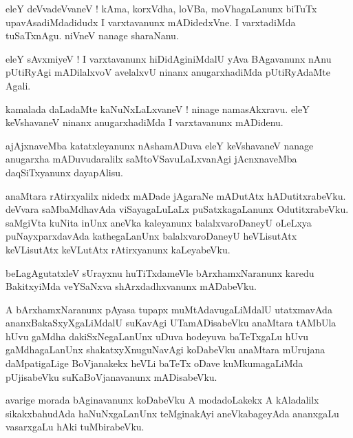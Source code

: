 \documentclass{article}
\begin{document}
\begin{mn}%
eleY deVvadeVvaneV ! kAma, korxVdha, loVBa, moVhagaLanunx biTuTx upavAsadiMdadidudx I varxtavanunx mADidedxVne. I 
varxtadiMda tuSaTxnAgu. niVneV nanage sharaNanu.
\end{mn}

\begin{mn}%
eleY sAvxmiyeV ! I varxtavanunx hiDidAginiMdalU yAva BAgavanunx nAnu pUtiRyAgi mADilalxvoV avelalxvU  ninanx 
anugarxhadiMda pUtiRyAdaMte Agali.
\end{mn}

\begin{mn}%
kamalada daLadaMte kaNuNxLaLxvaneV ! ninage namasAkxravu. eleY keVshavaneV ninanx anugarxhadiMda I varxtavanunx mADidenu.
\end{mn}

\begin{mn}%
ajAjxnaveMba katatxleyanunx nAshamADuva eleY keVshavaneV nanage anugarxha mADuvudaralilx saMtoVSavuLaLxvanAgi 
jAcnxnaveMba daqSiTxyanunx dayapAlisu.
\end{mn}

\begin{mn}%
anaMtara rAtirxyalilx nidedx mADade jAgaraNe mADutAtx hADutitxrabeVku. deVvara saMbaMdhavAda viSayagaLuLaLx 
puSatxkagaLanunx OdutitxrabeVku. saMgiVta kuNita inUnx aneVka kaleyanunx balalxvaroDaneyU oLeLxya puNayxparxdavAda 
kathegaLanUnx balalxvaroDaneyU heVLisutAtx keVLisutAtx keVLutAtx rAtirxyanunx kaLeyabeVku.
\end{mn}

\begin{mn}%
beLagAgutatxleV sUrayxnu huTiTxdameVle bArxhamxNaranunx karedu BakitxyiMda veYSaNxva shArxdadhxvanunx mADabeVku.
\end{mn}

\begin{mn}%
A bArxhamxNaranunx pAyasa tupapx muMtAdavugaLiMdalU utatxmavAda ananxBakaSxyXgaLiMdalU suKavAgi UTamADisabeVku 
anaMtara tAMbUla hUvu gaMdha dakiSxNegaLanUnx uDuva hodeyuva baTeTxgaLu hUvu gaMdhagaLanUnx shakatxyXnuguNavAgi 
koDabeVku  anaMtara mUrujana daMpatigaLige BoVjanakekx heVLi baTeTx oDave kuMkumagaLiMda pUjisabeVku suKaBoVjanavanunx 
mADisabeVku.
\end{mn}

\begin{mn}%
avarige morada bAginavanunx koDabeVku A modadoLakekx A kAladalilx sikakxbahudAda haNuNxgaLanUnx teMginakAyi aneVkabageyAda ananxgaLu vasarxgaLu hAki tuMbirabeVku.
\end{mn}
\end{document}
